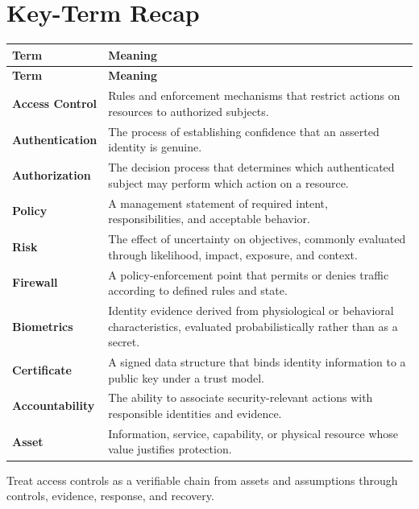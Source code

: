 \documentclass[11pt]{article}
\begin{document}
\section*{Key-Term Recap}
\begin{longtable}{>{\RaggedRight\arraybackslash}p{}>{\RaggedRight\arraybackslash}p{}}
\toprule\rowcolor{Navy}\color{white}\textbf{Term} & \color{white}\textbf{Meaning}\\\midrule
\endfirsthead
\toprule\rowcolor{Navy}\color{white}\textbf{Term} & \color{white}\textbf{Meaning}\\\midrule
\endhead
\textbf{Access Control} & Rules and enforcement mechanisms that restrict actions on resources to authorized subjects. \\\midrule
\textbf{Authentication} & The process of establishing confidence that an asserted identity is genuine. \\\midrule
\textbf{Authorization} & The decision process that determines which authenticated subject may perform which action on a resource. \\\midrule
\textbf{Policy} & A management statement of required intent, responsibilities, and acceptable behavior. \\\midrule
\textbf{Risk} & The effect of uncertainty on objectives, commonly evaluated through likelihood, impact, exposure, and context. \\\midrule
\textbf{Firewall} & A policy-enforcement point that permits or denies traffic according to defined rules and state. \\\midrule
\textbf{Biometrics} & Identity evidence derived from physiological or behavioral characteristics, evaluated probabilistically rather than as a secret. \\\midrule
\textbf{Certificate} & A signed data structure that binds identity information to a public key under a trust model. \\\midrule
\textbf{Accountability} & The ability to associate security-relevant actions with responsible identities and evidence. \\\midrule
\textbf{Asset} & Information, service, capability, or physical resource whose value justifies protection. \\\midrule
\bottomrule
\end{longtable}
\begin{takeawaybox}
Treat access controls as a verifiable chain from assets and assumptions through controls, evidence, response, and recovery.
\end{takeawaybox}
\end{document}
